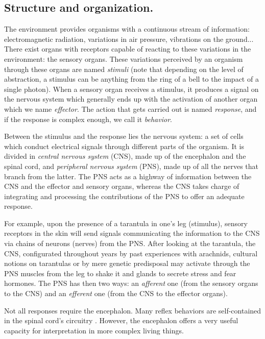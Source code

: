 \subsection{Structure and organization.}

The environment provides organisms with a continuous stream of information: electromagnetic radiation, variations in air pressure, vibrations on the ground... There exist organs with receptors capable of reacting to these variations in the environment: the sensory organs. These variations perceived by an organism through these organs are named \textit{stimuli} (note that depending on the level of abstraction, a stimulus can be anything from the ring of a bell to the impact of a single photon). When a sensory organ receives a stimulus, it produces a signal on the nervous system which generally ends up with the activation of another organ which we name \textit{effector}. The action that gets carried out is named \textit{response}, and if the response is complex enough, we call it \textit{behavior}.

Between the stimulus and the response lies the nervous system: a set of cells which conduct electrical signals through different parts of the organism. It is divided in \textit{central nervous system} (CNS), made up of the encephalon and the spinal cord, and \textit{peripheral nervous system} (PNS), made up of all the nerves that branch from the latter. The PNS acts as a highway of information between the CNS and the effector and sensory organs, whereas the CNS takes charge of integrating and processing the contributions of the PNS to offer an adequate response.

For example, upon the presence of a tarantula in one's leg (stimulus), sensory receptors in the skin will send signals communicating the information to the CNS via chains of neurons (nerves) from the PNS. After looking at the tarantula, the CNS, configurated throughout years by past experiences with arachnids, cultural notions on tarantulas or by mere genetic predisposal may activate through the PNS muscles from the leg to shake it and glands to secrete stress and fear hormones. The PNS has then two ways: an \textit{afferent} one (from the sensory organs to the CNS) and an \textit{efferent} one (from the CNS to the effector organs).

Not all responses require the encephalon. Many reflex behaviors are self-contained in the spinal cord's circuitry . However, the encephalon offers a very useful capacity for interpretation in more complex living things.

